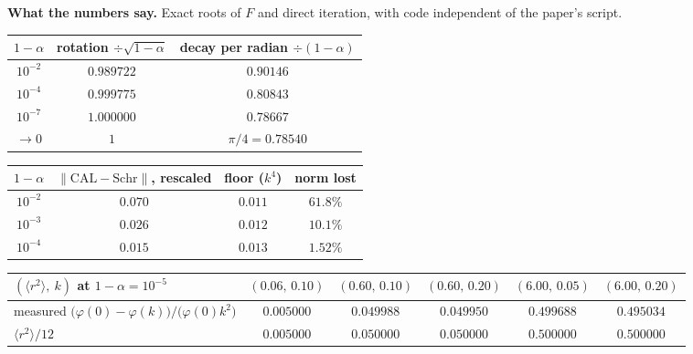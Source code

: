 \documentclass[10pt]{article}
\begin{document}
\vspace{2pt}
\begin{smallbox}
\textbf{What the numbers say.} Exact roots of $F$ and direct iteration, with code independent of the paper's script.\par\vspace{2pt}
\begin{minipage}[t]{0.47\linewidth}
\renewcommand{\arraystretch}{1.0}\setlength{\tabcolsep}{4pt}
\begin{tabular}[t]{@{}c c c@{}}
\toprule
$1-\alpha$ & rotation $\div\sqrt{1-\alpha}$ & decay per radian $\div(1-\alpha)$\\
\midrule
$10^{-2}$ & $0.989722$ & $0.90146$\\
$10^{-4}$ & $0.999775$ & $0.80843$\\
$10^{-7}$ & $1.000000$ & $0.78667$\\
$\to0$ & $1$ & $\pi/4=0.78540$\\
\bottomrule
\end{tabular}
\end{minipage}\hfill
\begin{minipage}[t]{0.5\linewidth}
\renewcommand{\arraystretch}{1.0}\setlength{\tabcolsep}{4pt}
\begin{tabular}[t]{@{}c c c c@{}}
\toprule
$1-\alpha$ & $\lVert\text{CAL}-\text{Schr}\rVert$, rescaled & floor ($k^4$) & norm lost\\
\midrule
$10^{-2}$ & $0.070$ & $0.011$ & $61.8\%$\\
$10^{-3}$ & $0.026$ & $0.012$ & $10.1\%$\\
$10^{-4}$ & $0.015$ & $0.013$ & $1.52\%$\\
\bottomrule
\end{tabular}
\end{minipage}\par\vspace{2pt}
{\renewcommand{\arraystretch}{1.0}\setlength{\tabcolsep}{4pt}
\begin{tabular}[t]{@{}l c c c c c@{}}
\toprule
$(\langle r^2\rangle,\ k)$ at $1-\alpha=10^{-5}$ & $(0.06,\,0.10)$ & $(0.60,\,0.10)$ & $(0.60,\,0.20)$ & $(6.00,\,0.05)$ & $(6.00,\,0.20)$\\
\midrule
measured $\big(\varphi(0)-\varphi(k)\big)/\big(\varphi(0)k^2\big)$ & $0.005000$ & $0.049988$ & $0.049950$ & $0.499688$ & $0.495034$\\
$\langle r^2\rangle/12$ & $0.005000$ & $0.050000$ & $0.050000$ & $0.500000$ & $0.500000$\\
\bottomrule
\end{tabular}\hfill
}
\end{smallbox}
\end{document}
